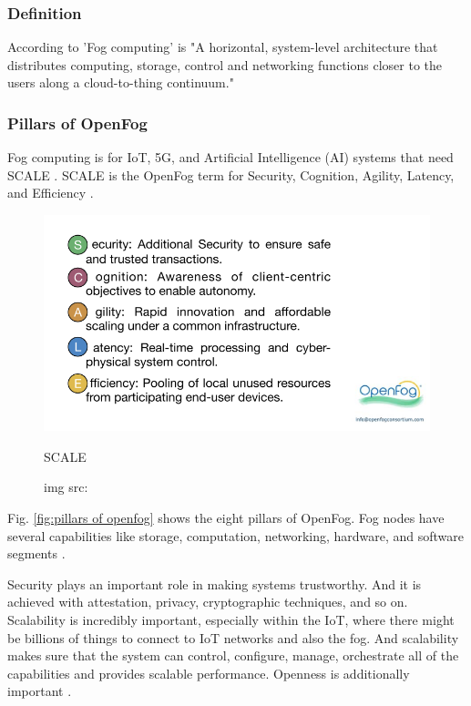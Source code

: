 
\subsubsection{Definition}

According to \cite{openfog2017openfog} 'Fog computing' is "A horizontal, system-level architecture that distributes computing, storage, control and networking functions closer to the users along a cloud-to-thing continuum."


\subsubsection{Pillars of OpenFog}

Fog computing is for IoT, 5G, and Artificial Intelligence (AI) systems that need SCALE \cite{ambrose}. SCALE is the OpenFog term for Security, Cognition, Agility, Latency, and Efficiency \cite{mukherjee2018survey}.

\begin{figure}[H]
    \centering
    \includegraphics[width=.6\linewidth]{image/SCALE.png}
    \caption{SCALE}
    \caption*{img src: \cite{mukherjee2018survey}}
    \label{fig:scale}
\end{figure}

Fig. \ref{fig:pillars of openfog} shows the eight pillars of OpenFog. Fog nodes have several capabilities like storage, computation, networking, hardware, and software segments \cite{youtube}. \par

Security plays an important role in making systems trustworthy. And it is achieved with attestation, privacy, cryptographic techniques, and so on.
Scalability is incredibly important, especially within the IoT, where there might be billions of things to connect to IoT networks and also the fog.
And scalability makes sure that the system can control, configure, manage, orchestrate all of the capabilities and provides scalable performance. Openness is additionally important \cite{youtube}. 

